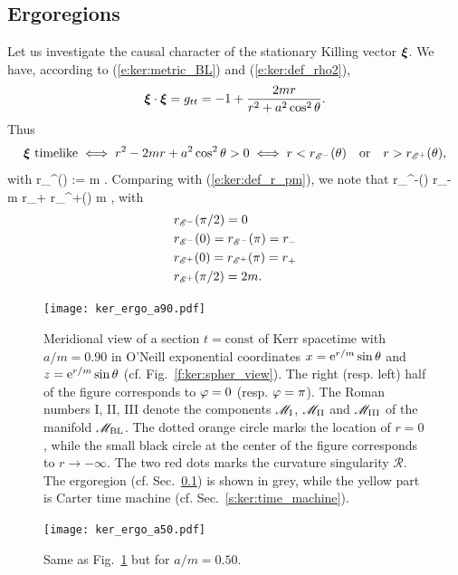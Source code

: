 \subsection{Ergoregions} \label{s:ker:ergoregion}

Let us investigate the causal character of the stationary Killing vector $\bm{\xi}$.
We have, according to (\ref{e:ker:metric_BL}) and (\ref{e:ker:def_rho2}),
\[
    \bm{\xi}\cdot\bm{\xi} = g_{tt} = - 1 + \frac{2m r}{r^2 + a^2\cos^2\theta} .
\]
Thus
\[
    \bm{\xi}\ \mbox{timelike} \iff r^2 - 2 m r + a^2\cos^2\theta > 0
        \iff r < r_{\mathscr{E}^-}(\theta) \quad\mbox{or}\quad  r > r_{\mathscr{E}^+}(\theta) ,
\]
with
\be
    r_{\E^\pm}(\theta) := m \pm {} .
\ee
Comparing with (\ref{e:ker:def_r_pm}), we note that
 \leq r_{\E^-}(\theta) \leq r_- \leq m \leq r_+ \leq r_{\E^+}(\theta)
         m ,
\ee
with
\begin{subequations}
\begin{align}
 & r_{\mathscr{E}^-}(\pi/2) = 0 \\
 & r_{\mathscr{E}^-}(0)  = r_{\mathscr{E}^-}(\pi) = r_- \\
 & r_{\mathscr{E}^+}(0)  = r_{\mathscr{E}^+}(\pi) = r_+ \\
 & r_{\mathscr{E}^+}(\pi/2) = 2 m .
\end{align}
\end{subequations}

\begin{figure}
\centerline{\texttt{[image: ker\_ergo\_a90.pdf]}}
\caption[]{\label{f:ker:ergo_a90} \footnotesize
Meridional view of a section $t=\mathrm{const}$ of Kerr spacetime with $a/m=0.90$ in
O'Neill exponential coordinates $x = \mathrm{e}^{r/m}\sin\theta$ and $z = \mathrm{e}^{r/m}\sin\theta$ (cf. Fig.~\ref{f:ker:spher_view}).
The right (resp. left) half of the figure corresponds to $\varphi=0$ (resp. $\varphi=\pi$).
The Roman numbers I, II, III denote the components $\mathscr{M}_{\rm I}$, $\mathscr{M}_{\rm II}$ and
$\mathscr{M}_{\rm III}$ of the manifold $\mathscr{M}_{\rm BL}$. The dotted orange circle marks the location
of $r=0$, while the small black circle at the center of the figure corresponds to
$r\rightarrow -\infty$. The two red dots marks the curvature singularity $\mathscr{R}$.
The ergoregion (cf. Sec.~\ref{s:ker:ergoregion}) is shown in grey, while the
yellow part is Carter time machine (cf. Sec.~\ref{s:ker:time_machine}).
}
\end{figure}

\begin{figure}
\centerline{\texttt{[image: ker\_ergo\_a50.pdf]}}
\caption[]{\label{f:ker:ergo_a50} \footnotesize
Same as Fig.~\ref{f:ker:ergo_a90} but for $a/m=0.50$.
}
\end{figure}

